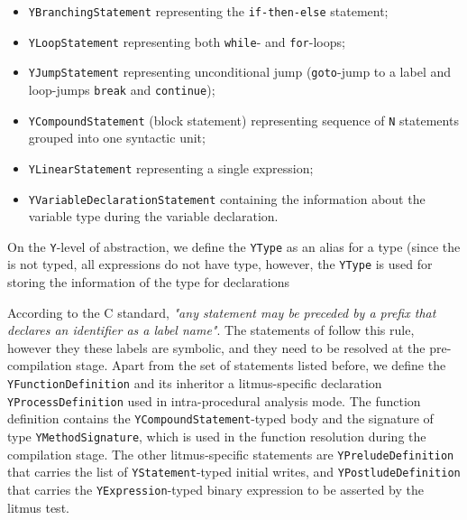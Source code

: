 \begin{itemize}%
  \item \texttt{YBranchingStatement} representing the \texttt{if-then-else} statement;
  
  \item \texttt{YLoopStatement} representing both \texttt{while}- and \texttt{for}-loops;%
  
  \item \texttt{YJumpStatement} representing unconditional jump (\texttt{goto}-jump to a label and loop-jumps \texttt{break} and \texttt{continue});
  
  \item \texttt{YCompoundStatement} (block statement) representing sequence of \texttt{N} statements grouped into one syntactic unit;
  
  \item \texttt{YLinearStatement} representing a single expression;
  
  \item \texttt{YVariableDeclarationStatement} containing the information about the variable type during the variable declaration.
\end{itemize}

On the \texttt{Y}-level of abstraction, we define the \texttt{YType} as an alias for a type (since the \ytree{} is not typed, all expressions do not have type, however, the \texttt{YType} is used for storing the information of the type for declarations

According to the C standard, \textit{"any statement may be preceded by a prefix that declares an identifier as a label name"}.
The \ytree{} statements of follow this rule, however they these labels are symbolic, and they need to be resolved at the pre-compilation stage.
Apart from the set of statements listed before, we define the \texttt{YFunctionDefinition} and its inheritor a litmus-specific declaration \texttt{YProcessDefinition}
used in intra-procedural analysis mode.
The function definition contains the \texttt{YCompoundStatement}-typed body and the signature of type \texttt{YMethodSignature}, which is used in the function resolution during the compilation stage. %
The other litmus-specific statements are \texttt{YPreludeDefinition}
that carries the list of \texttt{YStatement}-typed initial writes, and \texttt{YPostludeDefinition} 
that carries the \texttt{YExpression}-typed binary expression to be asserted by the litmus test.

